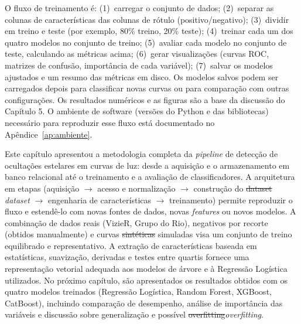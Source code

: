 \documentclass[msc]{on} %
\makeatletter
\providecommand{\DIFaddtex}[1]{{\protect\color{red}#1}} %
\providecommand{\DIFdeltex}[1]{{\protect\color{red}\sout{#1}}} %
\providecommand{\DIFaddbegin}{} %
\providecommand{\DIFaddend}{} %
\providecommand{\DIFdelbegin}{} %
\providecommand{\DIFdelend}{} %
\providecommand{\DIFadd}[1]{\texorpdfstring{\DIFaddtex{#1}}{#1}} %
\providecommand{\DIFdel}[1]{\texorpdfstring{\DIFdeltex{#1}}{}} %
\let\sout@orig\sout %
\renewcommand{\sout}[1]{\ifmmode\text{\sout@orig{\ensuremath{#1}}}\else\sout@orig{#1}\fi} %
\makeatother
\begin{document}
O fluxo de treinamento é: (1)~carregar o conjunto de dados; (2)~separar as colunas de características das colunas de rótulo (positivo/negativo); (3)~dividir em treino e teste (por exemplo, 80\% treino, 20\% teste); (4)~treinar cada um dos quatro modelos no conjunto de treino; (5)~avaliar cada modelo no conjunto de teste, calculando as métricas acima; (6)~gerar visualizações (curvas ROC, matrizes de confusão, importância de cada variável); (7)~salvar os modelos ajustados e um resumo das métricas em disco. Os modelos salvos podem ser carregados depois para classificar novas curvas ou para comparação com outras configurações. Os resultados numéricos e as figuras são a base da discussão do Capítulo 5. \DIFaddbegin \DIFadd{O ambiente de software (versões do Python e das bibliotecas) necessário para reproduzir esse fluxo está documentado no Apêndice~\ref{ap:ambiente}.
}\DIFaddend 


Este capítulo apresentou a metodologia completa da \textit{pipeline} de detecção de ocultações estelares em curvas de luz: desde a aquisição e o armazenamento em banco relacional até o treinamento e a avaliação de classificadores. A arquitetura em etapas (aquisição \(\to\) acesso e normalização \(\to\) construção do \DIFdelbegin \DIFdel{dataset }\DIFdelend \DIFaddbegin \textit{\DIFadd{dataset}} \DIFaddend \(\to\) engenharia de características \(\to\) treinamento) permite reproduzir o fluxo e estendê-lo com novas fontes de dados, novas \textit{features} ou novos modelos. A combinação de dados reais (VizieR, Grupo do Rio), negativos por recorte (obtidos manualmente) e curvas \DIFdelbegin \DIFdel{sintéticas }\DIFdelend \DIFaddbegin \DIFadd{simuladas }\DIFaddend visa um conjunto de treino equilibrado e representativo. A extração de características baseada em estatísticas, suavização, derivadas e testes entre quartis fornece uma representação vetorial adequada aos modelos de árvore e à Regressão Logística utilizados. No próximo capítulo, são apresentados os resultados obtidos com os quatro modelos treinados (Regressão Logística, Random Forest, XGBoost, CatBoost), incluindo comparação de desempenho, análise de importância das variáveis e discussão sobre generalização e possível \DIFdelbegin \DIFdel{overfitting}\DIFdelend \DIFaddbegin \textit{\DIFadd{overfitting}}\DIFaddend .
\end{document}
